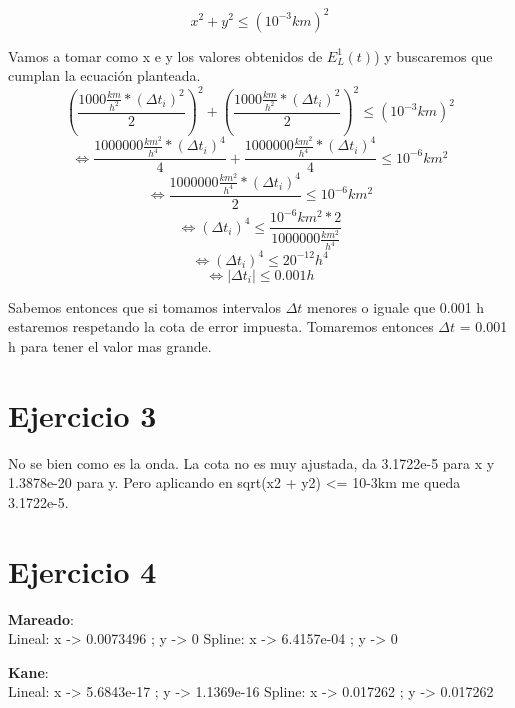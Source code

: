 \documentclass[a4paper,10pt]{article}
\begin{document}
\begin{equation}
	x^2 + y^2 \leq (10^{-3} km)^2
\end{equation}
\par Vamos a tomar como x e y los valores obtenidos de $E_L^1(t)$) y buscaremos que cumplan la ecuación planteada.
\begin{equation}
	(\frac{1000 \frac{km}{h^2} * (\Delta t_i)^2}{2})^2 + (\frac{1000 \frac{km}{h^2} * (\Delta t_i)^2}{2})^2 \leq (10^{-3} km)^2
\end{equation}
\begin{equation}
	\Leftrightarrow \frac{1000000 \frac{km^2}{h^4} * (\Delta t_i)^4}{4} + \frac{1000000 \frac{km^2}{h^4} * (\Delta t_i)^4}{4} \leq 10^{-6} km^2
\end{equation}
\begin{equation}
	\Leftrightarrow \frac{1000000 \frac{km^2}{h^4} * (\Delta t_i)^4}{2} \leq 10^{-6} km^2
\end{equation}
\begin{equation}
	\Leftrightarrow (\Delta t_i)^4 \leq \frac{10^{-6} km^2 * 2}{1000000 \frac{km^2}{h^4}}
\end{equation}
\begin{equation}
	\Leftrightarrow (\Delta t_i)^4 \leq 20^{-12} h^4
\end{equation}
\begin{equation}
	\Leftrightarrow | \Delta t_i | \leq 0.001 h
\end{equation}
\par Sabemos entonces que si tomamos intervalos $\Delta t$ menores o iguale que 0.001 h estaremos respetando la cota de error impuesta. Tomaremos entonces $\Delta t$ = 0.001 h para tener el valor mas grande.



\section{Ejercicio 3}
No se bien como es la onda. La cota no es muy ajustada, da 3.1722e-5 para x y 1.3878e-20 para y. Pero aplicando en sqrt(x2 + y2) <= 10-3km me queda 3.1722e-5.


\section{Ejercicio 4}
\textbf{Mareado}:\\
Lineal: x -> 0.0073496  ;  y -> 0
Spline: x -> 6.4157e-04  ;  y -> 0

\textbf{Kane}:\\
Lineal: x -> 5.6843e-17  ;  y -> 1.1369e-16
Spline: x -> 0.017262  ;  y -> 0.017262
\end{document}

